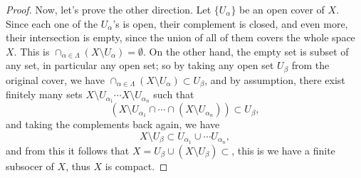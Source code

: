 \documentclass[oneside,english]{amsart}
\numberwithin{equation}{section}
\numberwithin{figure}{section}
\begin{document}
\begin{proof}
Now, let's prove the other direction. Let $\{U_\alpha\}$ be an open cover of $X$. Since each one of the $U_{\alpha}$'s is open, their complement is closed, and even more, their intersection is empty, since the union of all of them covers the whole space $X$. This is $\cap_{\alpha\in \Lambda}(X\setminus U_{\alpha})=\emptyset.$
On the other hand, the empty set is subset of any set, in particular any open set; so by taking any open set $U_{\beta}$ from the original cover, we have $\cap_{\alpha\in\Lambda}(X\setminus U_{\alpha})\subset U_{\beta}$, and by assumption, there exist finitely many sets $X\setminus U_{\alpha_1}\cdots X\setminus U_{\alpha_n}$ such that
\begin{displaymath}
  (X\setminus U_{\alpha_1}\cap\cdots\cap(X\setminus U_{\alpha_n}))\subset U_{\beta},
\end{displaymath}
and taking the complements back again, we have 
\begin{displaymath}
  X\setminus U_{\beta}\subset U_{\alpha_1}\cup\cdots U_{\alpha_n},
\end{displaymath}
and from this it follows that $X = U_{\beta}\cup (X\setminus U_{\beta})\subset$, this is we have a finite subsocer of $X$, thus $X$ is compact.
\end{proof}
\end{document}
